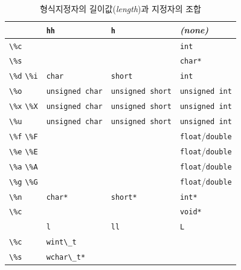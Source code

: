 \documentclass[a4paper,12pt]{book}
\newcommand{\V}[1]{\Verb|#1|}
\begin{document}
\begingroup
    \centering
    \begin{longtable}{ || m{5em} || m{7.5em} | m{10em} | m{7.5em} || }
        \caption{형식지정자의 길이값(\textit{length})과 지정자의 조합}
        \label{Tab:format-length}

        \hline                 & \V{hh}            & \V{h}                  & \textit{(none)}      \\
        \hline
        \hline \V{\%c}         &                   &                        & \V{int}              \\ 
        \hline \V{\%s}         &                   &                        & \V{char*}            \\ 
        \hline \V{\%d} \V{\%i} & \V{char}          & \V{short}              & \V{int}              \\
        \hline \V{\%o}         & \V{unsigned char} & \V{unsigned short}     & \V{unsigned int}     \\
        \hline \V{\%x} \V{\%X} & \V{unsigned char} & \V{unsigned short}     & \V{unsigned int}     \\
        \hline \V{\%u}         & \V{unsigned char} & \V{unsigned short}     & \V{unsigned int}     \\
        \hline \V{\%f} \V{\%F} &                   &                        & \V{float}/\V{double} \\
        \hline \V{\%e} \V{\%E} &                   &                        & \V{float}/\V{double} \\
        \hline \V{\%a} \V{\%A} &                   &                        & \V{float}/\V{double} \\
        \hline \V{\%g} \V{\%G} &                   &                        & \V{float}/\V{double} \\
        \hline \V{\%n}         & \V{char*}         & \V{short*}             & \V{int*}             \\
        \hline \V{\%c}         &                   &                        & \V{void*}            \\ 
        \hline
        \hline                 & \V{l}             & \V{ll}                 & \V{L}                \\
        \hline
        \hline \V{\%c}         & \V{wint\_t}       &                        &                      \\ 
        \hline \V{\%s}         & \V{wchar\_t*}     &                        &                      \\ 

\end{longtable}
\end{document}

